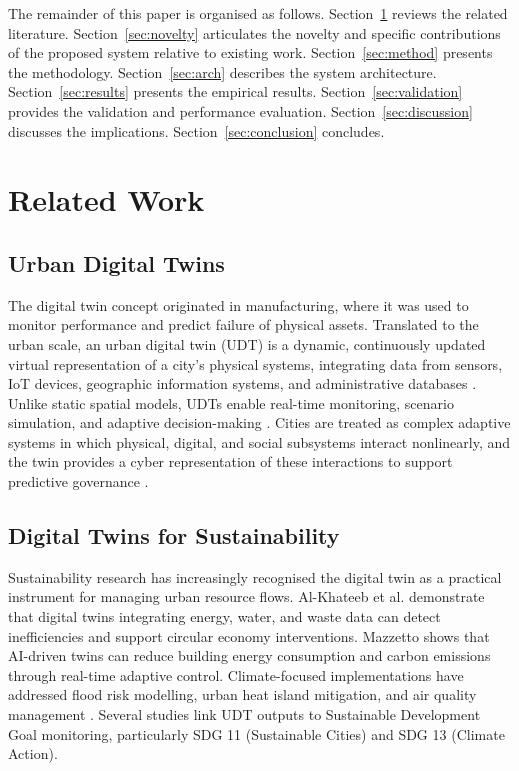 \documentclass[conference]{IEEEtran}
\begin{document}
The remainder of this paper is organised as follows.
Section~\ref{sec:related} reviews the related literature.
Section~\ref{sec:novelty} articulates the novelty and specific
contributions of the proposed system relative to existing work.
Section~\ref{sec:method} presents the methodology.
Section~\ref{sec:arch} describes the system architecture.
Section~\ref{sec:results} presents the empirical results.
Section~\ref{sec:validation} provides the validation and performance
evaluation. Section~\ref{sec:discussion} discusses the implications.
Section~\ref{sec:conclusion} concludes.

\section{Related Work}
\label{sec:related}

\subsection{Urban Digital Twins}

The digital twin concept originated in manufacturing, where it was used
to monitor performance and predict failure of physical assets. Translated
to the urban scale, an urban digital twin (UDT) is a dynamic,
continuously updated virtual representation of a city's physical systems,
integrating data from sensors, IoT devices, geographic information
systems, and administrative databases \cite{alkhateeb2024}. Unlike
static spatial models, UDTs enable real-time monitoring, scenario
simulation, and adaptive decision-making \cite{therias2023}. Cities are
treated as complex adaptive systems in which physical, digital, and
social subsystems interact nonlinearly, and the twin provides a cyber
representation of these interactions to support predictive governance
\cite{alexandrov2024}.

\subsection{Digital Twins for Sustainability}

Sustainability research has increasingly recognised the digital twin as
a practical instrument for managing urban resource flows.
Al-Khateeb et al. \cite{alkhateeb2024} demonstrate that digital twins
integrating energy, water, and waste data can detect inefficiencies and
support circular economy interventions. Mazzetto \cite{mazzetto2024}
shows that AI-driven twins can reduce building energy consumption and
carbon emissions through real-time adaptive control. Climate-focused
implementations have addressed flood risk modelling, urban heat island
mitigation, and air quality management \cite{zhu2025}. Several studies
link UDT outputs to Sustainable Development Goal monitoring, particularly
SDG 11 (Sustainable Cities) and SDG 13 (Climate Action).
\end{document}
